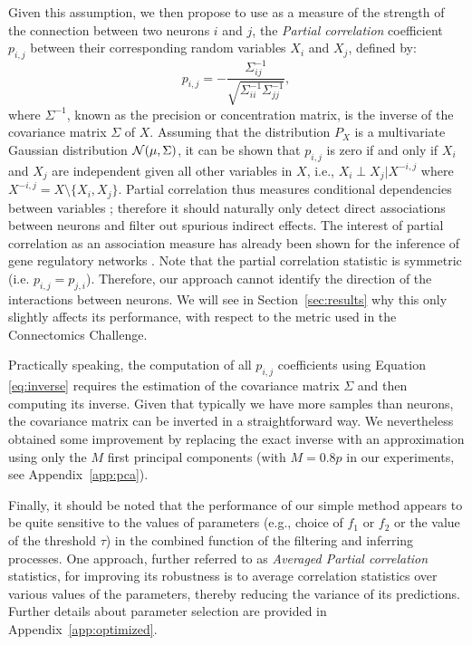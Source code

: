 \documentclass[wcp]{jmlr}
\begin{document}
Given this assumption, we then propose to use as a measure of the
strength of the connection between two neurons $i$ and $j$, the
\textit{Partial correlation} coefficient $p_{i,j}$ between their corresponding
random variables $X_i$ and $X_j$, defined by:
\begin{equation}
p_{i,j} =
-\frac{\Sigma^{-1}_{ij}}{\sqrt{\Sigma^{-1}_{ii} \Sigma^{-1}_{jj}}}, \label{eq:inverse}
\end{equation}
where $\Sigma^{-1}$, known as the precision or concentration matrix, is the inverse of the covariance matrix $\Sigma$ of $X$. 
Assuming that the distribution $P_X$ is a multivariate Gaussian
distribution ${\cal N}(\mu,\Sigma)$, it can be shown that $p_{i,j}$ is
zero if and only if $X_i$ and $X_j$ are independent given all other
variables in $X$, i.e., $X_i \perp X_j|X^{-i,j}$ where $X^{-i,j}= X
\setminus\{X_i,X_j\}$. Partial correlation thus measures conditional
dependencies between variables ; therefore it should naturally only detect direct associations
between neurons and filter out spurious indirect effects. The interest
of partial correlation as an association measure has already been
shown for the inference of gene regulatory networks
\citep{de2004discovery,Schafer:2005}.
Note that the partial correlation statistic is symmetric
(i.e. $p_{i,j}=p_{j,i}$). Therefore, our approach cannot identify the
direction of the interactions between neurons. We will see in
Section~\ref{sec:results} why this only slightly affects its
performance, with respect to the metric used in the Connectomics
Challenge. 

Practically speaking, the computation of all $p_{i,j}$ coefficients using Equation
\ref{eq:inverse} requires the estimation of the covariance matrix $\Sigma$
and then computing its inverse. Given that typically we have more
samples than neurons, the covariance matrix can be inverted in a
straightforward way. We nevertheless obtained some improvement by
replacing the exact inverse with an approximation using only the $M$
first principal components \citep{bishop2006pattern} (with
$M=0.8 p$ in our experiments, see Appendix~\ref{app:pca}). 

Finally, it should be noted that the performance of our simple method appears to
be quite sensitive to the values of parameters (e.g., choice of $f_1$ or $f_2$
or the value of the threshold $\tau$) in the combined function of the
filtering and inferring processes. One approach, further referred
to as \textit{Averaged Partial correlation} statistics, for improving
its robustness is to average correlation statistics over various
values of the parameters, thereby reducing the variance of its
predictions. Further details about parameter selection are provided in
Appendix~\ref{app:optimized}.
\end{document}
